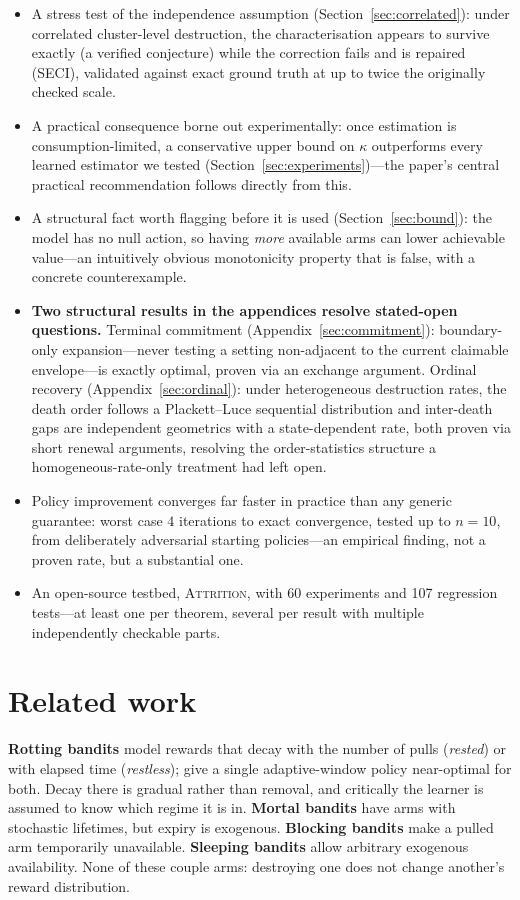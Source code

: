 \begin{itemize}
\item A stress test of the independence assumption (Section~\ref{sec:correlated}):
under correlated cluster-level destruction, the characterisation appears to survive
exactly (a verified conjecture) while the correction fails and is repaired (SECI),
validated against exact ground truth at up to twice the originally checked scale.
\item A practical consequence borne out experimentally: once estimation is
consumption-limited, a conservative upper bound on $\kappa$ outperforms every
learned estimator we tested (Section~\ref{sec:experiments})---the paper's
central practical recommendation follows directly from this.
\item A structural fact worth flagging before it is used (Section~\ref{sec:bound}):
the model has no null action, so having \emph{more} available arms can lower
achievable value---an intuitively obvious monotonicity property that is false,
with a concrete counterexample.
\item \textbf{Two structural results in the appendices resolve stated-open
questions.} Terminal commitment (Appendix~\ref{sec:commitment}): boundary-only expansion---never
testing a setting non-adjacent to the current claimable envelope---is exactly
optimal, proven via an exchange argument. Ordinal recovery (Appendix~\ref{sec:ordinal}):
under heterogeneous destruction rates, the death order follows a
Plackett--Luce sequential distribution and inter-death gaps are independent
geometrics with a state-dependent rate, both proven via short renewal
arguments, resolving the order-statistics structure a homogeneous-rate-only
treatment had left open.
\item Policy improvement converges far faster in practice than any generic
guarantee: worst case $4$ iterations to exact convergence, tested up to
$n=10$, from deliberately adversarial starting policies---an empirical
finding, not a proven rate, but a substantial one.
\item An open-source testbed, \textsc{Attrition}, with 60 experiments and 107
regression tests---at least one per theorem, several per result with multiple
independently checkable parts.
\end{itemize}

\section{Related work}

\textbf{Rotting bandits} \citep{levine2017,seznec2019,seznec2020} model rewards that
decay with the number of pulls (\emph{rested}) or with elapsed time
(\emph{restless}); \citet{seznec2020} give a single adaptive-window
policy near-optimal for both. Decay there is gradual rather than removal, and
critically the learner is assumed to know which regime it is in.
\textbf{Mortal bandits} \citep{chakrabarti2008} have arms with stochastic lifetimes,
but expiry is exogenous. \textbf{Blocking bandits} make a pulled arm temporarily
unavailable. \textbf{Sleeping bandits} \citep{kleinberg2010} allow arbitrary
exogenous availability. None of these couple arms: destroying one does not change
another's reward distribution.

